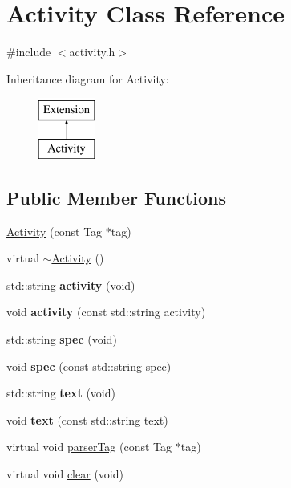 \hypertarget{classActivity}{
\section{Activity Class Reference}
\label{classActivity}
}


{\ttfamily \#include $<$activity.h$>$}

Inheritance diagram for Activity:\begin{figure}[H]
\begin{center}
\leavevmode
\includegraphics[height=2.000000cm]{classActivity}
\end{center}
\end{figure}
\subsection*{Public Member Functions}
\begin{DoxyCompactItemize}
\item 
\hyperlink{classActivity_a93db22f748fdf5110d4718a8cd8b5512}{Activity} (const Tag $\ast$tag)
\item 
virtual \hyperlink{classActivity_a4622df19c79b9dcd7b8c0074200447a0}{$\sim$Activity} ()
\item 
\hypertarget{classActivity_a2afb82fb326c8d3d590e011ce63cbc11}{
std::string {\bfseries activity} (void)}
\label{classActivity_a2afb82fb326c8d3d590e011ce63cbc11}

\item 
\hypertarget{classActivity_adf61214159fcace0d5fb41b59c3b0ec4}{
void {\bfseries activity} (const std::string activity)}
\label{classActivity_adf61214159fcace0d5fb41b59c3b0ec4}

\item 
\hypertarget{classActivity_a72e092be85236159d2fbca432108d707}{
std::string {\bfseries spec} (void)}
\label{classActivity_a72e092be85236159d2fbca432108d707}

\item 
\hypertarget{classActivity_a6b33c7b7e36e56f9fa03955d5544d931}{
void {\bfseries spec} (const std::string spec)}
\label{classActivity_a6b33c7b7e36e56f9fa03955d5544d931}

\item 
\hypertarget{classActivity_a018a725931038e5ea4ae9620646cc077}{
std::string {\bfseries text} (void)}
\label{classActivity_a018a725931038e5ea4ae9620646cc077}

\item 
\hypertarget{classActivity_a01e31fca6adb2bf25a3a756c4c58b88e}{
void {\bfseries text} (const std::string text)}
\label{classActivity_a01e31fca6adb2bf25a3a756c4c58b88e}

\item 
virtual void \hyperlink{classActivity_a853ec90fa8746a4e86955fcd645746d2}{parserTag} (const Tag $\ast$tag)
\item 
virtual void \hyperlink{classActivity_add2145e0f4811f67f15009a92d7acfa5}{clear} (void)
\end{DoxyCompactItemize}
